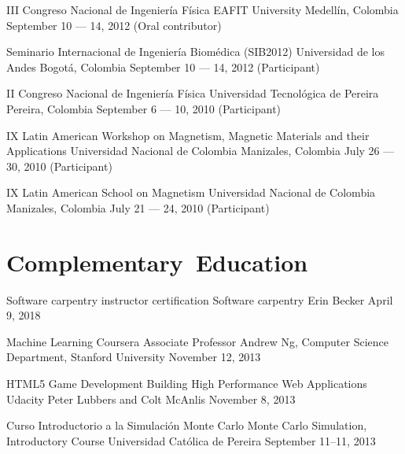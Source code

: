 \documentclass[12pt,english]{moderncv}
\begin{document}
        {III Congreso Nacional de Ingeniería Física}
        {EAFIT University}
        {Medellín, Colombia}
        {September 10 --- 14, 2012}
        {(Oral contributor)}

        {Seminario Internacional de Ingeniería Biomédica (SIB2012)}
        {Universidad de los Andes}
        {Bogotá, Colombia}
        {September 10 --- 14, 2012}
        {(Participant)}

        {II Congreso Nacional de Ingeniería Física}
        {Universidad Tecnol\'ogica de Pereira}
        {Pereira, Colombia}
        {September 6 --- 10, 2010}
        {(Participant)}

        {IX Latin American Workshop on Magnetism, Magnetic Materials and their Applications}
        {Universidad Nacional de Colombia}
        {Manizales, Colombia}
        {July 26 --- 30, 2010}
        {(Participant)}

        {IX Latin American School on Magnetism}
        {Universidad Nacional de Colombia}
        {Manizales, Colombia}
        {July 21 --- 24, 2010}
        {(Participant)}


\section{Complementary~Education}

        {Software carpentry instructor certification}
        {}
        {Software carpentry}
        {Erin Becker}
        {April 9, 2018}

        {Machine Learning}
        {}
        {Coursera}
        {Associate Professor Andrew Ng, Computer Science Department, Stanford University}
        {November 12, 2013}

        {HTML5 Game Development}
        {Building High Performance Web Applications}
        {Udacity}
        {Peter Lubbers and Colt McAnlis}
        {November 8, 2013}

        {Curso Introductorio a la Simulación Monte Carlo}
        {Monte Carlo Simulation, Introductory Course}
        {Universidad Católica de Pereira}
        {}
        {September 11--11, 2013}
\end{document}
